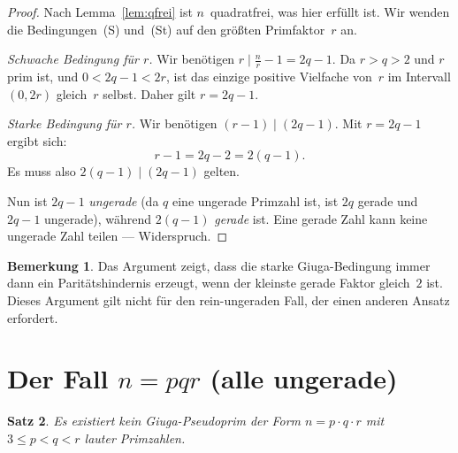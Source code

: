 \documentclass[12pt,a4paper]{amsart}
\newtheorem{theorem}{Satz}[section]
\theoremstyle{definition}
\newtheorem{remark}[theorem]{Bemerkung}
\begin{document}
\begin{proof}
Nach Lemma~\ref{lem:qfrei} ist $n$~quadratfrei, was hier erfüllt ist.
Wir wenden die Bedingungen~(S) und~(St) auf den größten Primfaktor~$r$ an.

\medskip
\noindent\textit{Schwache Bedingung für $r$.}\quad
Wir benötigen $r \mid \tfrac{n}{r} - 1 = 2q - 1$.
Da $r > q > 2$ und $r$ prim ist, und $0 < 2q - 1 < 2r$,
ist das einzige positive Vielfache von~$r$ im Intervall $(0, 2r)$ gleich~$r$ selbst.
Daher gilt $r = 2q - 1$.

\medskip
\noindent\textit{Starke Bedingung für $r$.}\quad
Wir benötigen $(r - 1) \mid (2q - 1)$.
Mit $r = 2q - 1$ ergibt sich:
\[
  r - 1 = 2q - 2 = 2(q - 1).
\]
Es muss also $2(q-1) \mid (2q - 1)$ gelten.

Nun ist $2q - 1$ \emph{ungerade} (da $q$ eine ungerade Primzahl ist, ist $2q$ gerade
und $2q - 1$ ungerade), während $2(q - 1)$ \emph{gerade} ist.
Eine gerade Zahl kann keine ungerade Zahl teilen — Widerspruch.
\end{proof}

\begin{remark}
Das Argument zeigt, dass die starke Giuga-Bedingung immer dann ein Paritätshindernis
erzeugt, wenn der kleinste gerade Faktor gleich~$2$ ist. Dieses Argument gilt nicht
für den rein-ungeraden Fall, der einen anderen Ansatz erfordert.
\end{remark}

\section{Der Fall \texorpdfstring{$n = pqr$}{n = pqr} (alle ungerade)}
\label{sec:ungerade}

\begin{theorem}
\label{thm:pqr}
Es existiert kein Giuga-Pseudoprim der Form $n = p \cdot q \cdot r$
mit $3 \le p < q < r$ lauter Primzahlen.
\end{theorem}
\end{document}
